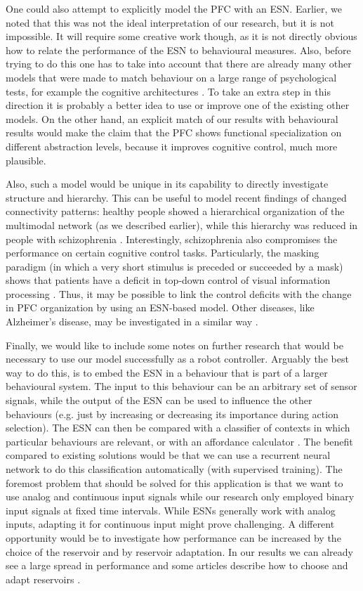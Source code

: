 \documentclass[10pt,a4paper]{report}
\begin{document}
One could also attempt to explicitly model the PFC with an ESN. Earlier, we noted that this was not the ideal interpretation of our research, but it is not impossible. It will require some creative work though, as it is not directly obvious how to relate the performance of the ESN to behavioural measures. Also, before trying to do this one has to take into account that there are already many other models that were made to match behaviour on a large range of psychological tests, for example the cognitive architectures \citep{Anderson1997}. To take an extra step in this direction it is probably a better idea to use or improve one of the existing other models. On the other hand, an explicit match of our results with behavioural results would make the claim that the PFC shows functional specialization on different abstraction levels, because it improves cognitive control, much more plausible.

Also, such a model would be unique in its capability to directly investigate structure and hierarchy. This can be useful to model recent findings of changed connectivity patterns: healthy people showed a hierarchical organization of the multimodal network (as we described earlier), while this hierarchy was reduced in people with schizophrenia \citep{Bassett2008}. Interestingly, schizophrenia also compromises the performance on certain cognitive control tasks. Particularly, the masking paradigm (in which a very short stimulus is preceded or succeeded by a mask) shows that patients have a deficit in top-down control of visual information processing \citep{Gilbert2007}. Thus, it may be possible to link the control deficits with the change in PFC organization by using an ESN-based model. Other diseases, like Alzheimer's disease, may be investigated in a similar way \citep{Sporns2011a}.

Finally, we would like to include some notes on further research that would be necessary to use our model successfully as a robot controller. Arguably the best way to do this, is to embed the ESN in a behaviour that is part of a larger behavioural system. The input to this behaviour can be an arbitrary set of sensor signals, while the output of the ESN can be used to influence the other behaviours (e.g. just by increasing or decreasing its importance during action selection). The ESN can then be compared with a classifier of contexts in which particular behaviours are relevant, or with an affordance calculator \citep{Scheutz2004}. The benefit compared to existing solutions would be that we can use a recurrent neural network to do this classification automatically (with supervised training). The foremost problem that should be solved for this application is that we want to use analog and continuous input signals while our research only employed binary input signals at fixed time intervals. While ESNs generally work with analog inputs, adapting it for continuous input might prove challenging. A different opportunity would be to investigate how performance can be increased by the choice of the reservoir and by reservoir adaptation. In our results we can already see a large spread in performance and some articles describe how to choose and adapt reservoirs \citep{Jarvis2010, Sussillo2009, Dutoit2009}.
 
\end{document}
